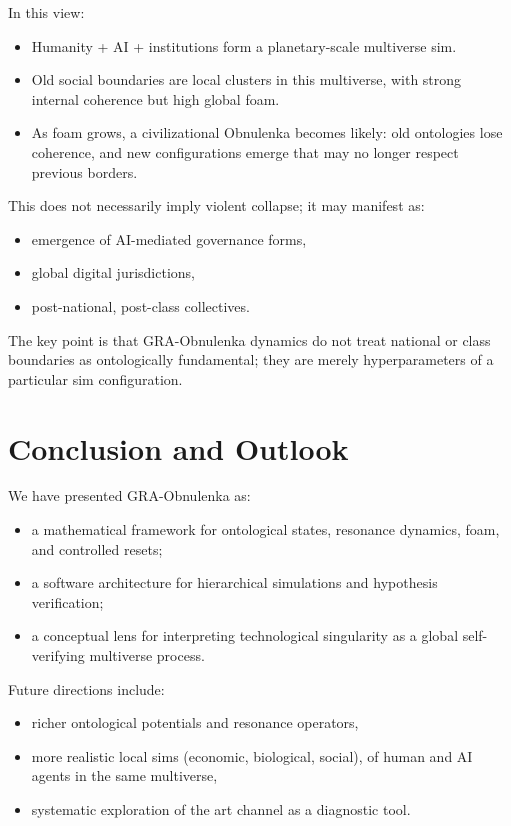 \documentclass[11pt,a4paper]{article}
\begin{document}
In this view:
\begin{itemize}
  \item Humanity + AI + institutions form a planetary-scale multiverse sim.
  \item Old social boundaries are local clusters in this multiverse,
        with strong internal coherence but high global foam.
  \item As foam grows, a civilizational Obnulenka becomes likely:
        old ontologies lose coherence, and new configurations emerge
        that may no longer respect previous borders.
\end{itemize}

This does not necessarily imply violent collapse;
it may manifest as:
\begin{itemize}
  \item emergence of AI-mediated governance forms,
  \item global digital jurisdictions,
  \item post-national, post-class collectives.
\end{itemize}
The key point is that GRA-Obnulenka dynamics
do not treat national or class boundaries as ontologically fundamental;
they are merely hyperparameters of a particular sim configuration.

\section{Conclusion and Outlook}
We have presented GRA-Obnulenka as:
\begin{itemize}
  \item a mathematical framework for ontological states,
        resonance dynamics, foam, and controlled resets;
  \item a software architecture for hierarchical simulations
        and hypothesis verification;
  \item a conceptual lens for interpreting technological singularity
        as a global self-verifying multiverse process.
\end{itemize}

Future directions include:
\begin{itemize}
  \item richer ontological potentials and resonance operators,
  \item more realistic local sims (economic, biological, social),
  \integration of human and AI agents in the same multiverse,
  \item systematic exploration of the art channel as a diagnostic tool.
\end{itemize}
\end{document}
